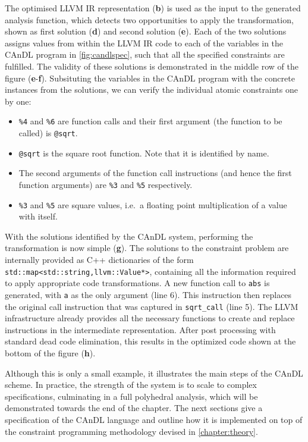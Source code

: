     The optimised LLVM IR representation ({\bf b}) is used as the input to the
    generated analysis function, which detects two opportunities to apply the
    transformation, shown as first solution ({\bf d}) and second solution
    ({\bf e}).
    Each of the two solutions assigns values from within the LLVM IR code to
    each of the variables in the CAnDL program in \autoref{fig:candlspec}, such
    that all the specified constraints are fulfilled.
    The validity of these solutions is demonstrated in the middle row of the
    figure ({\bf e}-{\bf f}).
    Subsituting the variables in the CAnDL program with the concrete
    instances from the solutions, we can verify the individual atomic
    constraints one by one:
    \begin{itemize}
    \item \texttt{\%4} and \texttt{\%6} are function calls and their first
          argument (the function to be called) is \texttt{@sqrt}.
    \item \texttt{@sqrt} is the square root function.
          Note that it is identified by name.
    \item The second arguments of the function call instructions (and hence the
          first function arguments) are \texttt{\%3} and \texttt{\%5}
          respectively.
    \item \texttt{\%3} and \texttt{\%5} are square values, i.e.\ a floating
          point multiplication of a value with itself.
    \end{itemize}

    With the solutions identified by the CAnDL system, performing the
    transformation is now simple ({\bf g}).
    The solutions to the constraint problem are internally provided as C++
    dictionaries of the form \texttt{std::map<std::string,llvm::Value*>},
    containing all the information required to apply appropriate code
    transformations.
    A new function call to \texttt{abs} is generated, with \texttt{a} as the
    only argument (line 6).
    This instruction then replaces the original call instruction that was
    captured in \texttt{sqrt\_call} (line 5).
    The LLVM infrastructure already provides all the necessary functions
    to create and replace instructions in the intermediate representation.
    After post processing with standard dead code elimination, this results in
    the optimized code shown at the bottom of the figure ({\bf h}).

    Although this is only a small example, it illustrates the main steps of the
    CAnDL scheme.
    In practice, the strength of the system is to scale to complex
    specifications, culminating in a full polyhedral analysis, which will be
    demonstrated towards the end of the chapter.
    The next sections give a specification of the CAnDL language and outline how
    it is implemented on top of the constraint programming methodology devised
    in \autoref{chapter:theory}.

